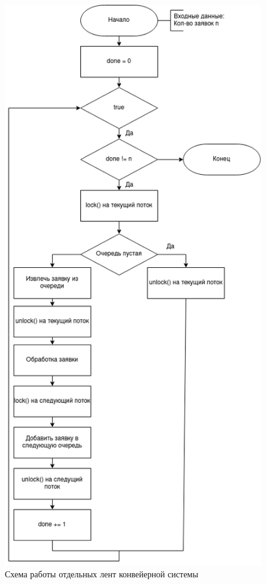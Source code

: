\begin{figure}[H]
	\begin{center}
		\includegraphics[scale=0.6]{assets/line.png}
	\end{center}
	\caption{Схема работы отдельных лент конвейерной системы}
\end{figure}

